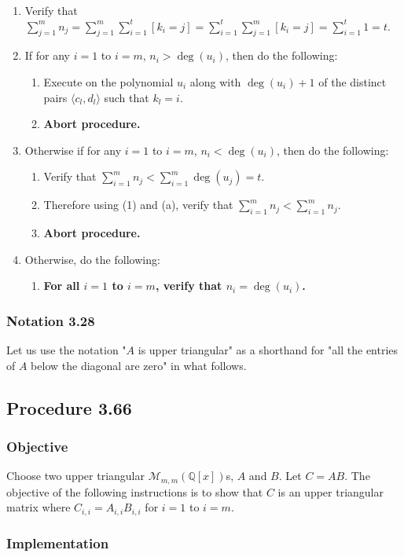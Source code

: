 \documentclass[twocolumn]{article}
\newcommand{\notation}[1]{\subsubsection*{Notation #1}}
\newcommand{\procedure}[2][]{\subsection*{Procedure #2 \ifthenelse{\equal{#1}{}}{}{(#1)}}\label{sec:procedure #2}}
\newcommand{\objective}{\subsubsection*{Objective}}
\newcommand{\implementation}{\subsubsection*{Implementation}}
\newcommand{\procedurehr}[2][]{\hyperref[sec:procedure #2]{\ifthenelse{\equal{#1}{}}{procedure #2}{#1}}}
\begin{document}
				\begin{enumerate}
					\item Verify that $\sum_{j=1}^m n_j=\sum_{j=1}^m\sum_{i=1}^t [k_i=j]=\sum_{i=1}^t\sum_{j=1}^m [k_i=j]=\sum_{i=1}^t 1=t$.
					\item If for any $i=1$ to $i=m$, $n_i>\deg(u_i)$, then do the following:
					\begin{enumerate}
						\item Execute \procedurehr{2.03} on the polynomial $u_i$ along with $\deg(u_i)+1$ of the distinct pairs $\langle c_l,d_l\rangle$ such that $k_l=i$.
						\item \textbf{Abort procedure.}
					\end{enumerate}
					\item Otherwise if for any $i=1$ to $i=m$, $n_i<\deg(u_i)$, then do the following:
					\begin{enumerate}
						\item Verify that $\sum_{i=1}^m n_j<\sum_{i=1}^m \deg(u_j)=t$.
						\item Therefore using (1) and (a), verify that $\sum_{i=1}^m n_j<\sum_{i=1}^m n_j$.
						\item \textbf{Abort procedure.}
					\end{enumerate}
					\item Otherwise, do the following:
					\begin{enumerate}
						\item \textbf{For all $i=1$ to $i=m$, verify that $n_i=\deg(u_i)$.}
					\end{enumerate}
				\end{enumerate}
		\notation{3.28}
			Let us use the notation "$A$ is upper triangular" as a shorthand for "all the entries of $A$ below the diagonal are zero" in what follows. 
		\procedure{3.66}
			\objective
				Choose two upper triangular $\mathcal{M}_{m,m}(\mathbb{Q}[x])$s, $A$ and $B$. Let $C=AB$. The objective of the following instructions is to show that $C$ is an upper triangular matrix where $C_{i,i}=A_{i,i}B_{i,i}$ for $i=1$ to $i=m$.
			\implementation
\end{document}

